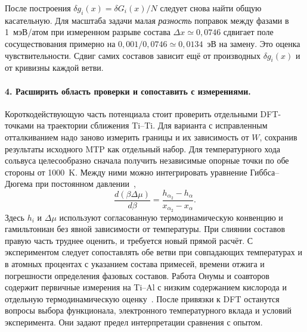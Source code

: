 \documentclass[11pt,a4paper]{article}
\begin{document}
После построения \(\delta g_i(x)=\delta G_i(x)/N\) следует снова найти
общую касательную. Для масштаба задачи малая \emph{разность} поправок
между фазами в 1~мэВ/атом при измеренном разрыве состава
\(\Delta x\simeq0{,}0746\) сдвигает поле сосуществования примерно на
\(0{,}001/0{,}0746\simeq0{,}0134\)~эВ на замену. Это оценка
чувствительности. Сдвиг самих составов зависит ещё от производных
\(\delta g_i(x)\) и от кривизны каждой ветви.

\paragraph{4. Расширить область проверки и сопоставить с измерениями.}
Короткодействующую часть потенциала стоит проверить отдельными DFT-точками
на траектории сближения Ti--Ti. Для варианта с исправленным отталкиванием
надо заново измерить границы и их зависимость от \(W\), сохранив результаты
исходного MTP как отдельный набор. Для температурного хода сольвуса
целесообразно сначала получить независимые опорные точки по обе стороны
от 1000~K. Между ними можно интегрировать уравнение Гиббса--Дюгема
при постоянном давлении~\cite{nam2007},
\[
 \frac{d(\beta\Delta\mu)}{d\beta}
     =\frac{h_{\alpha_2}-h_\alpha}{x_{\alpha_2}-x_\alpha}.
\]
Здесь \(h_i\) и \(\Delta\mu\) используют согласованную термодинамическую
конвенцию и гамильтониан без явной зависимости от температуры. При слиянии
составов правую часть труднее оценить, и требуется новый прямой расчёт.
С экспериментом следует сопоставлять обе ветви при совпадающих температурах
и в атомных процентах с указанием состава примесей, времени отжига и
погрешности определения фазовых составов. Работа Онумы и соавторов
содержит первичные измерения на Ti--Al с низким содержанием кислорода и
отдельную термодинамическую оценку~\cite{ohnuma2000}. После привязки к DFT
останутся вопросы выбора функционала, электронного температурного вклада
и условий эксперимента. Они задают предел интерпретации сравнения с опытом.
\end{document}
